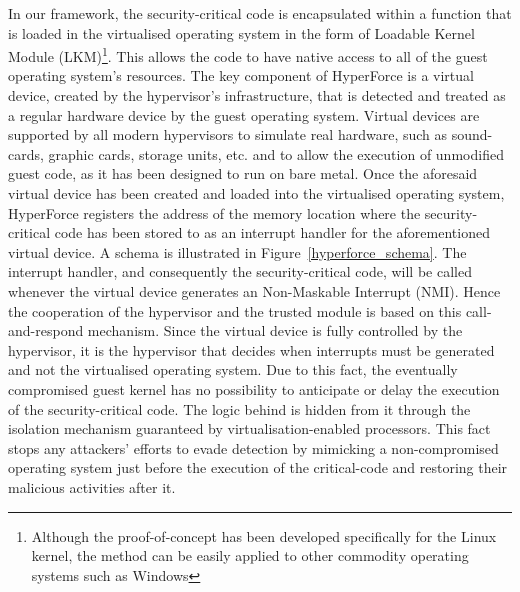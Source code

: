 In our framework, the security-critical code is encapsulated within a function that is loaded in the virtualised operating system in the form of Loadable Kernel Module (LKM)\footnote{Although the proof-of-concept has been developed specifically for the Linux kernel, the method can be easily applied to other commodity operating systems such as Windows}. This allows the code to have native access to all of the guest operating system's resources.
The key component of HyperForce is a virtual device, created by the hypervisor's infrastructure, that is detected and treated as a regular hardware device by the guest operating system.  
Virtual devices are supported by all modern hypervisors to simulate real hardware, such as sound-cards, graphic cards, storage units, etc. and to allow the execution of unmodified guest code, as it has been designed to run on bare metal. 
Once the aforesaid virtual device has been created and loaded into the virtualised operating system, HyperForce registers the address of the memory location where the security-critical code has been stored to as an interrupt handler for the aforementioned virtual device. A schema is illustrated in Figure~\ref{hyperforce_schema}. 
The interrupt handler, and consequently the security-critical code, will be called whenever the virtual device generates an Non-Maskable Interrupt (NMI). Hence the cooperation of the hypervisor and the trusted module is based on this call-and-respond mechanism.
Since the virtual device is fully controlled by the hypervisor, it is the hypervisor that decides when interrupts must be generated and not the virtualised operating system. Due to this fact, the eventually compromised guest kernel has no possibility to anticipate or delay the execution of the security-critical code. The logic behind is hidden from it through the isolation mechanism guaranteed by virtualisation-enabled processors.  
This fact stops any attackers' efforts to evade detection by mimicking a non-compromised operating system just before the execution of the critical-code and restoring their malicious activities after it.

